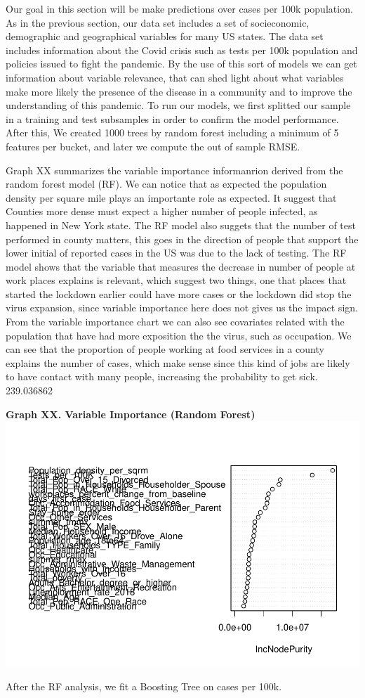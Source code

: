\documentclass[
]{article}
\begin{document}
Our goal in this section will be make predictions over cases per 100k
population. As in the previous section, our data set includes a set of
socieconomic, demographic and geographical variables for many US states.
The data set includes information about the Covid crisis such as tests
per 100k population and policies issued to fight the pandemic. By the
use of this sort of models we can get information about variable
relevance, that can shed light about what variables make more likely the
presence of the disease in a community and to improve the understanding
of this pandemic. To run our models, we first splitted our sample in a
training and test subsamples in order to confirm the model performance.
After this, We created 1000 trees by random forest including a minimum
of 5 features per bucket, and later we compute the out of sample RMSE.

Graph XX summarizes the variable importance informanrion derived from
the random forest model (RF). We can notice that as expected the
population density per square mile plays an importante role as expected.
It suggest that Counties more dense must expect a higher number of
people infected, as happened in New York state. The RF model also
suggets that the number of test performed in county matters, this goes
in the direction of people that support the lower initial of reported
cases in the US was due to the lack of testing. The RF model shows that
the variable that measures the decrease in number of people at work
places explains is relevant, which suggest two things, one that places
that started the lockdown earlier could have more cases or the lockdown
did stop the virus expansion, since variable importance here does not
gives us the impact sign. From the variable importance chart we can also
see covariates related with the population that have had more exposition
the the virus, such as occupation. We can see that the proportion of
people working at food services in a county explains the number of
cases, which make sense since this kind of jobs are likely to have
contact with many people, increasing the probability to get sick.
239.036862

\textbf{Graph XX. Variable Importance (Random Forest)}
\includegraphics{covid_tree_analysis_files/figure-latex/unnamed-chunk-13-1.pdf}

After the RF analysis, we fit a Boosting Tree on cases per 100k.
\end{document}
